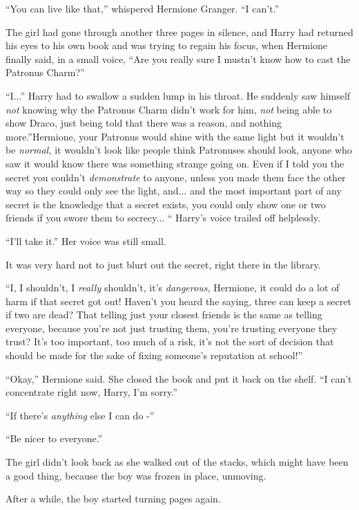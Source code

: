 ``You can live like that,'' whispered Hermione Granger. ``I can't.''

The girl had gone through another three pages in silence, and Harry had
returned his eyes to his own book and was trying to regain his focus,
when Hermione finally said, in a small voice, ``Are you really sure I
mustn't know how to cast the Patronus Charm?''

``I...'' Harry had to swallow a sudden lump in his throat. He
suddenly saw himself \emph{not} knowing why the Patronus Charm didn't
work for him, \emph{not} being able to show Draco, just being told that
there was a reason, and nothing more.''Hermione, your Patronus would
shine with the same light but it wouldn't be \emph{normal,} it wouldn't
look like people think Patronuses should look, anyone who saw it would
know there was something strange going on. Even if I told you the secret
you couldn't \emph{demonstrate} to anyone, unless you made them face the
other way so they could only see the light, and... and the most
important part of any secret is the knowledge that a secret exists, you
could only show one or two friends if you swore them to secrecy...
`` Harry's voice trailed off helplessly.

``I'll take it.'' Her voice was still small.

It was very hard not to just blurt out the secret, right there in the
library.

``I, I shouldn't, I \emph{really} shouldn't, it's \emph{dangerous,}
Hermione, it could do a lot of harm if that secret got out! Haven't you
heard the saying, three can keep a secret if two are dead? That telling
just your closest friends is the same as telling everyone, because
you're not just trusting them, you're trusting everyone they trust? It's
too important, too much of a risk, it's not the sort of decision that
should be made for the sake of fixing someone's reputation at school!''

``Okay,'' Hermione said. She closed the book and put it back on the
shelf. ``I can't concentrate right now, Harry, I'm sorry.''

``If there's \emph{anything} else I can do -''

``Be nicer to everyone.''

The girl didn't look back as she walked out of the stacks, which might
have been a good thing, because the boy was frozen in place, unmoving.

After a while, the boy started turning pages again.
